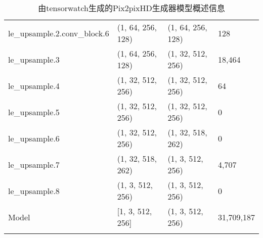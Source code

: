 \begin{longtable}{llll}
        le\_upsample.2.conv\_block.6 &  (1, 64, 256, 128) &  (1, 64, 256, 128) &         128 \\
                    le\_upsample.3 &  (1, 64, 256, 128) &  (1, 32, 512, 256) &      18,464 \\
                    le\_upsample.4 &  (1, 32, 512, 256) &  (1, 32, 512, 256) &          64 \\
                    le\_upsample.5 &  (1, 32, 512, 256) &  (1, 32, 512, 256) &           0 \\
                    le\_upsample.6 &  (1, 32, 512, 256) &  (1, 32, 518, 262) &           0 \\
                    le\_upsample.7 &  (1, 32, 518, 262) &   (1, 3, 512, 256) &       4,707 \\
                    le\_upsample.8 &   (1, 3, 512, 256) &   (1, 3, 512, 256) &           0 \\
                            Model &   [1, 3, 512, 256] &   (1, 3, 512, 256) &  31,709,187 \\
    \bottomrule
    \caption{由tensorwatch生成的Pix2pixHD生成器模型概述信息}
    \label{Pix2pixHD generator table}
\end{longtable}  
    
